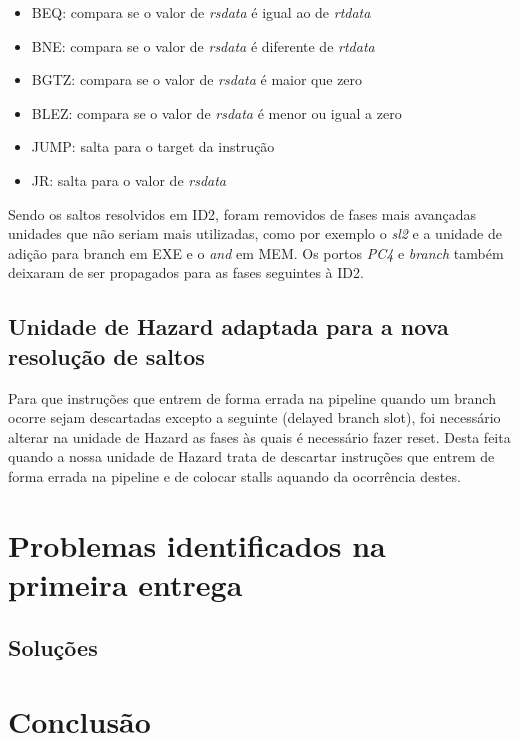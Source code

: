 \documentclass[pdftex,12pt,a4paper]{report}
\begin{document}
\begin{itemize}
\item BEQ: compara se o valor de \textit{rsdata} é igual ao de \textit{rtdata}
\item BNE: compara se o valor de \textit{rsdata} é diferente de \textit{rtdata} 
\item BGTZ: compara se o valor de \textit{rsdata} é maior que zero
\item BLEZ: compara se o valor de \textit{rsdata} é menor ou igual a zero
\item JUMP: salta para o target da instrução
\item JR: salta para o valor de \textit{rsdata}
\end{itemize} 

Sendo os saltos resolvidos em ID2, foram removidos de fases mais avançadas unidades que não seriam mais utilizadas, como por exemplo o \textit{sl2} e a unidade de adição para branch em EXE e o \textit{and} em MEM. Os portos \textit{PC4} e \textit{branch} também deixaram de ser propagados para as fases seguintes à ID2.

\subsection{Unidade de Hazard adaptada para a nova resolução de saltos}

Para que instruções que entrem de forma errada na pipeline quando um branch ocorre sejam descartadas excepto a seguinte (delayed branch slot), foi necessário alterar na unidade de Hazard as fases às quais é necessário fazer reset. Desta feita quando a nossa unidade de Hazard trata de descartar instruções que entrem de forma errada na pipeline e de colocar stalls aquando da ocorrência destes.

\section{Problemas identificados na primeira entrega}


\subsection{Soluções}

\newpage
\section{Conclusão}
\end{document}
